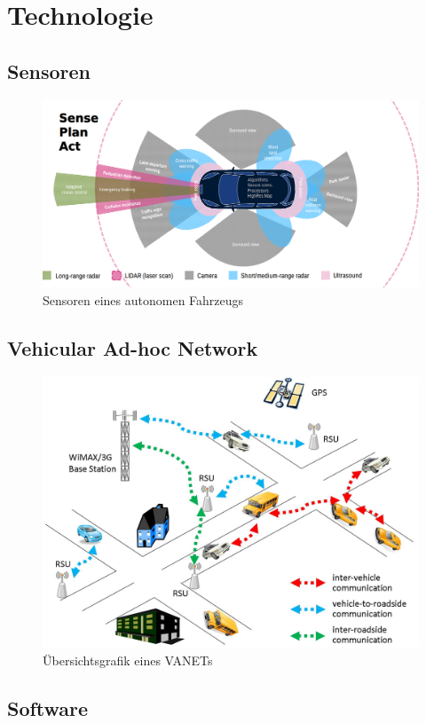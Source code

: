 \section{Technologie}

\subsection{Sensoren}


\begin{figure}[H]
    \centering
    \includegraphics[width=.485\textwidth]{resources/images/sensors.png}
    \caption{Sensoren eines autonomen Fahrzeugs \cite{smith2015automated}}
\end{figure}



\subsection{Vehicular Ad-hoc Network}

\begin{figure}[H]
    \centering
    \includegraphics[width=.485\textwidth]{resources/images/vanet.jpg}
    \caption{Übersichtsgrafik eines VANETs \cite{vanet}}
\end{figure}

\subsection{Software}
